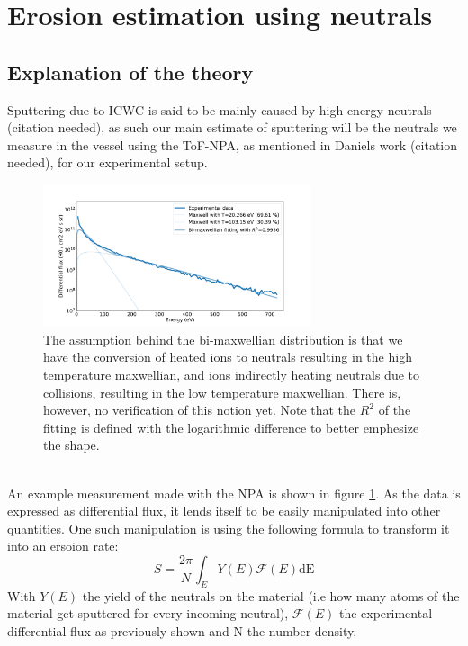 \documentclass{article}
\begin{document}
\section{Erosion estimation using neutrals}
\subsection{Explanation of the theory}
Sputtering due to ICWC is said to be mainly caused by high energy neutrals (citation needed), as such 
our main estimate of sputtering will be the neutrals we measure in the vessel
using the ToF-NPA, as mentioned in Daniels work (citation needed), for our experimental setup.
\noindent
\begin{figure}[ht]
    \centering
    \includegraphics[width=0.7\textwidth]{figures/NPA_example.pdf}
    \caption{The assumption behind the bi-maxwellian distribution is that we have
    the conversion of heated ions to neutrals resulting in the high temperature
    maxwellian, and ions indirectly heating neutrals due to collisions, resulting
    in the low temperature maxwellian. There is, however, no verification of this
    notion yet. Note that the $R^2$ of the fitting is
    defined with the logarithmic difference to better emphesize the shape.}
    \label{fig:examplemeasurement}
\end{figure}\\
An example measurement made with the NPA is shown in figure
\ref{fig:examplemeasurement}. As the data is expressed as differential flux,
it lends itself to be easily manipulated into other quantities. One such manipulation
is using the following formula to transform it into an ersoion rate:
\begin{equation}
    S = \frac{2\pi}{N} \int_E Y(E)\mathcal{F} (E) \text{dE}
    \label{eqn:ErosionRateFormal}
\end{equation}
With $Y(E)$ the yield of the neutrals on the material (i.e how many atoms of
the material get sputtered for every incoming neutral), $\mathcal{F}(E)$ the
experimental differential flux as previously shown and N the number density.
\end{document}
